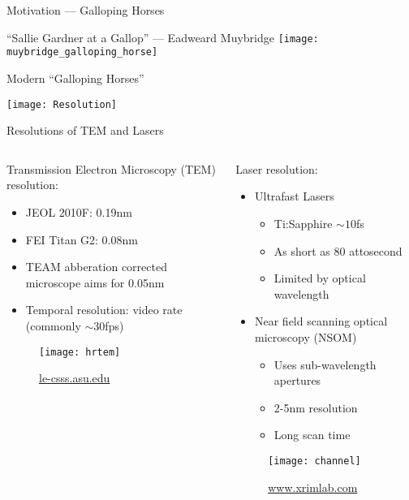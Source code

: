 \begin{frame}{Motivation --- Galloping Horses}
  \begin{center}
    ``Sallie Gardner at a Gallop'' --- Eadweard Muybridge
    \texttt{[image: muybridge\_galloping\_horse]}
  \end{center}
\end{frame}

\begin{frame}{Modern ``Galloping Horses''}
  \begin{center}
    \texttt{[image: Resolution]}
  \end{center}
\end{frame}

\begin{frame}{Resolutions of TEM and Lasers}
  \begin{columns}	
    \begin{column}{0.49\linewidth}
      Transmission Electron Microscopy (TEM) resolution:
      \begin{itemize}
        \item<2-> JEOL 2010F: 0.19nm
        \item<3-> FEI Titan G2: 0.08nm
        \item<4-> TEAM abberation corrected microscope aims for 0.05nm
        \item<5-> Temporal resolution: video rate (commonly $\sim$30fps)
      \end{itemize}
      \begin{figure}
        \centering
        \texttt{[image: hrtem]}
        \caption{\url{le-csss.asu.edu}}
      \end{figure}
    \end{column}
    \begin{column}{0.49\linewidth}
      Laser resolution:
      \begin{itemize}
        \item<6-> Ultrafast Lasers
        \begin{itemize}
          \item<7-> Ti:Sapphire $\sim 10$fs 
          \item<8-> As short as 80 attosecond
          \item<9-> Limited by optical wavelength
        \end{itemize}
        \item<10-> Near field scanning optical microscopy (NSOM)
        \begin{itemize}
          \item<10-> Uses sub-wavelength apertures
          \item<10-> 2-5nm resolution
          \item<10-> Long scan time
        \end{itemize}
      \end{itemize}
      \begin{figure}
        \centering
        \texttt{[image: channel]}
        \caption{\url{www.xrimlab.com}}
      \end{figure}
    \end{column}
  \end{columns}
\end{frame}

